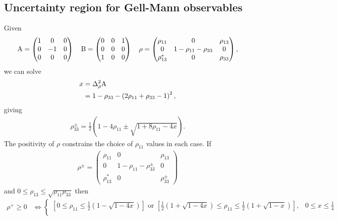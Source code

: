 \begin{subappendices}

\section{Uncertainty region for Gell-Mann observables}
\label{app:gellmann-ur}
Given
\begin{align}
  \operatorname{A} = \begin{pmatrix}
    1 & 0 & 0\\
    0 & -1 & 0\\
    0 & 0 & 0\\
  \end{pmatrix} \quad
  \operatorname{B} = \begin{pmatrix}
    0 & 0 & 1\\
    0 & 0 & 0\\
    1 & 0 & 0\\
  \end{pmatrix} \quad
  \rho =\begin{pmatrix}
    \rho_{11} & 0 & \rho_{13}\\
    0 & 1-\rho_{11} - \rho_{33} & 0\\
    \rho_{13}^* & 0 & \rho_{33}
  \end{pmatrix},
\end{align}
we can solve
\begin{align}
  x &= \varr{\opa}\\
    &= 1 - \rho_{33} - \left(2\rho_{11} + \rho_{33} - 1\right)^2,
\end{align}
giving
\begin{align}
  \rho_{33}^\pm = \frac{1}{2}\left(1-4\rho_{11} \pm\sqrt{1+8\rho_{11}-4x}\right).
\end{align}
The positivity of $\rho$ constrains the choice of $\rho_{11}$ values in each case. If
\begin{align}
  \rho^\pm = \begin{pmatrix}
    \rho_{11} & 0 & \rho_{13}\\
    0 & 1-\rho_{11} - \rho_{33}^\pm & 0\\
    \rho_{13}^* & 0 & \rho_{33}^\pm
  \end{pmatrix}
\end{align}
and $0\leq\rho_{13}\leq\sqrt{\rho_{11}\rho_{33}}$ then
\begin{align}
  \label{eqn:rho-plus-constraints}
  \rho^+ \geq 0 &\iff \begin{cases}\left[ 0\leq \rho_{11}\leq\frac{1}{2}(1-\sqrt{1-4x})\right] \text{ or } \left[\frac{1}{2}(1+\sqrt{1-4x})\leq\rho_{11}\leq\frac{1}{2}(1+\sqrt{1-x})\right],  &0\leq x\leq\frac{1}{4}\\

\end{cases}
\end{align}
\end{subappendices}
